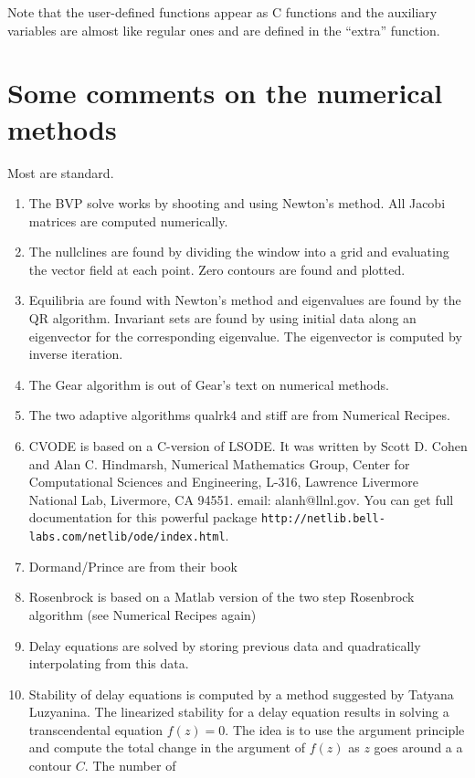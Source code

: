 \documentclass{article}
\begin{document}
Note that the user-defined functions appear as C functions and the
auxiliary variables are almost like regular ones and are defined in
the ``extra'' function.








\section{Some comments on the numerical methods}
Most are standard.
\begin{enumerate}
\item The BVP solve works
by shooting and using Newton's method.  All Jacobi matrices are computed
numerically.
\item The nullclines are found by dividing the window into a grid and
evaluating the vector field at each point.  Zero contours are found
and plotted.
\item Equilibria are found with Newton's method and eigenvalues are found by the QR
 algorithm.
Invariant sets are found by using initial data along an eigenvector
 for the corresponding eigenvalue.  The eigenvector is computed by inverse
iteration.
\item The Gear algorithm is out of Gear's text
on numerical methods.
\item The two adaptive algorithms qualrk4 and stiff
 are from Numerical Recipes.
\item CVODE is based on a C-version of LSODE.  It was written by
Scott D. Cohen and Alan C. Hindmarsh, Numerical Mathematics Group,
Center for Computational Sciences and Engineering, L-316,
Lawrence Livermore National Lab, Livermore, CA 94551. email: alanh@llnl.gov.
You can get full documentation for this powerful package
{\tt http://netlib.bell-labs.com/netlib/ode/index.html}.
\item Dormand/Prince are from their book
\item Rosenbrock is based on a Matlab version of the two step Rosenbrock
algorithm (see Numerical Recipes again)
\item Delay equations are solved by storing previous data and
quadratically  interpolating from this data.
\item Stability of delay equations is computed by a method suggested
by Tatyana Luzyanina. The linearized stability for a delay equation
results in solving a transcendental equation $f(z)=0.$ The idea is to
use the argument principle and compute the total change in the
argument of $f(z)$ as $z$ goes around a a contour $C.$ The number of

\end{enumerate}
\end{document}
